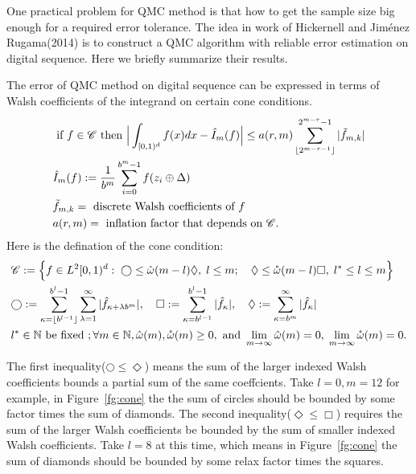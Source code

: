 

One practical problem for QMC method is that how to get the sample size big enough for a required error tolerance. The idea in work of Hickernell and Jiménez Rugama(2014)\cite{hickernell2014reliable} is to construct a QMC algorithm with reliable error estimation on digital sequence. Here we briefly summarize their results.

The error of QMC method on digital sequence can be expressed in terms of Walsh coefficients of the integrand on certain cone conditions. 
\begin{align}
    \label{eq:errBound}
    &\text{ if } f \in \mathscr{C}\text{ then } \Big|\int_{[0,1)^d}f(x)dx - \hat{I}_m(f)\Big| \leq a(r,m) \sum_{\lfloor 2^{m-r-1} \rfloor}^{2^{m-r}-1} |\tilde{f}_{m,k}|\\
    &\hat{I}_m(f): = \frac{1}{b^m}\sum_{i=0}^{b^m-1}f(z_i\oplus \Delta)\notag\\
    &\tilde{f}_{m,k}=\text{ discrete Walsh coefficients of }f \notag\\
    &a(r,m) =\text{ inflation factor that depends on } \mathscr{C} \notag.
\end{align}
Here is the defination of the cone condition:
\begin{align}
   &\mathscr{C}:=\Big\{f\in L^2[0,1)^d:\;\bigcirc \leq \hat{\omega}(m-l)\Diamond,\; l\leq m;\quad
   \Diamond \leq \mathring{\omega}(m-l) \Box, 
   \; l^*\leq l \leq m\Big\}\notag\\
   \label{eq:cone}
   &\bigcirc:= \sum_{\kappa=\lfloor b^{l-1} \rfloor}^{b^l-1} \sum_{\lambda=1}^{\infty}| \hat{f}_{\kappa+\lambda b^m}|,\quad  
   \Box:= \sum_{\kappa=b^{l-1}}^{b^l-1}|\hat{f}_\kappa|,\quad
   \Diamond:=\sum_{\kappa=b^m}^{\infty}|\hat{f}_{\kappa}|\\
   &l^*\in \mathbb{N}\text{ be fixed }; \forall m\in \mathbb{N},\hat{\omega}(m),\mathring{\omega}(m)\geq 0, \text{ and } \lim_{m\to \infty} \hat{\omega}(m)=0,\; \lim_{m\to \infty} \mathring{\omega}(m)=0\notag.
\end{align}

The first inequality($\bigcirc \leq \Diamond$) means the sum of the larger indexed Walsh coefficients bounds a partial sum of the same coeffcients. 
Take $l=0, m=12$ for example, in Figure~\ref{fg:cone} the the sum of circles should be bounded by some factor times the sum of diamonds. The second inequality($\Diamond\leq \Box$) requires the sum of the larger Walsh coefficients be bounded by the sum of smaller indexed Walsh coefficients. 
Take $l=8$ at this time, which means in Figure~\ref{fg:cone} the sum of diamonds should be bounded by some relax factor times the squares.

